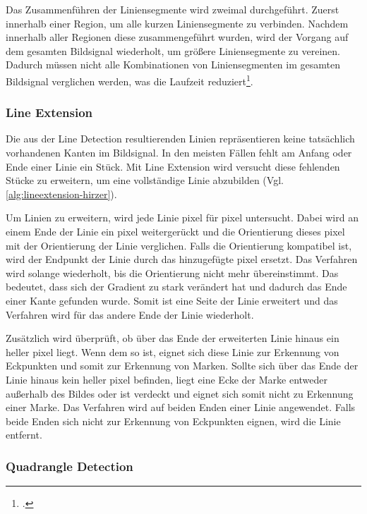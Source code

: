 Das Zusammenführen der Liniensegmente wird zweimal durchgeführt. Zuerst innerhalb einer Region, um alle kurzen
 Liniensegmente zu verbinden. Nachdem innerhalb aller Regionen diese zusammengeführt wurden, wird der Vorgang auf dem
 gesamten Bildsignal wiederholt, um größere Liniensegmente zu vereinen. Dadurch müssen nicht alle
 Kombinationen von Liniensegmenten im gesamten Bildsignal verglichen werden, was die Laufzeit
 reduziert\footcite[Vgl.][S.~10]{hirzer08}.


\subsubsection{Line Extension} %
\label{sub:line_extension}
Die aus der Line Detection resultierenden Linien repräsentieren keine tatsächlich vorhandenen Kanten im Bildsignal. In
 den meisten Fällen fehlt am Anfang oder Ende einer Linie ein Stück. Mit Line Extension wird versucht diese fehlenden
 Stücke zu erweitern, um eine vollständige Linie abzubilden (Vgl. \autoref{alg:lineextension-hirzer}).


Um Linien zu erweitern, wird jede Linie \gls{pixel} für \gls{pixel} untersucht. Dabei wird an einem Ende der Linie
 ein \gls{pixel} weitergerückt und die Orientierung dieses \gls{pixel} mit der Orientierung der Linie verglichen. Falls
 die Orientierung kompatibel ist, wird der Endpunkt der Linie durch das hinzugefügte \gls{pixel} ersetzt. Das Verfahren
 wird solange wiederholt, bis die Orientierung nicht mehr übereinstimmt. Das bedeutet, dass sich der Gradient zu stark
 verändert hat und dadurch das Ende einer Kante gefunden wurde. Somit ist eine Seite der Linie erweitert und das
 Verfahren wird für das andere Ende der Linie wiederholt.

Zusätzlich wird überprüft, ob über das Ende der erweiterten Linie hinaus ein heller \gls{pixel} liegt. Wenn dem so ist,
 eignet sich diese Linie zur Erkennung von Eckpunkten und somit zur Erkennung von Marken. Sollte sich über das Ende der
 Linie hinaus kein heller \gls{pixel} befinden, liegt eine Ecke der Marke entweder außerhalb des Bildes oder ist
 verdeckt und eignet sich somit nicht zu Erkennung einer Marke. Das Verfahren wird auf beiden Enden einer Linie
 angewendet. Falls beide Enden sich nicht zur Erkennung von Eckpunkten eignen, wird die Linie entfernt.

\subsubsection{Quadrangle Detection} %
\label{sub:quadrangle_detection}

